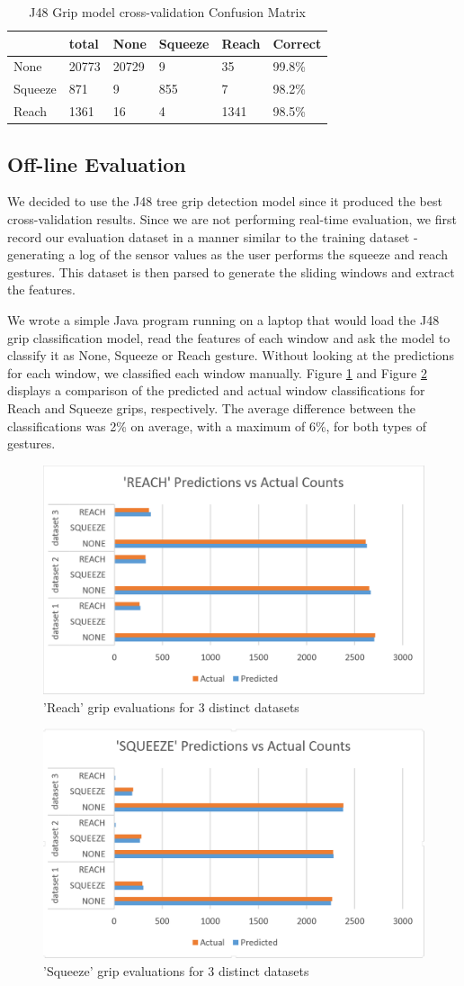 \begin{table}[!t]
\caption{J48 Grip model cross-validation Confusion Matrix}
\label{tbl-Grip Model J48}
\begin{tabular}{|l|l|l|l|l|l|}
\hline
        & total & None  & Squeeze & Reach & Correct \\ \hline \hline
None    & 20773 & 20729 & 9       & 35    & 99.8\%  \\ \hline
Squeeze & 871   & 9     & 855     & 7     & 98.2\%  \\ \hline
Reach   & 1361  & 16    & 4       & 1341  & 98.5\%  \\ \hline
\end{tabular}
\end{table}


\subsection{Off-line Evaluation}
We decided to use the J48 tree grip detection model since it produced the best cross-validation results. Since we are not performing real-time evaluation, we first record our evaluation dataset in a manner similar to the training dataset - generating a log of the sensor values as the user performs the squeeze and reach gestures. This dataset is then parsed to generate the sliding windows and extract the features. 
\par
We wrote a simple Java program running on a laptop that would load the J48 grip classification model, read the features of each window and ask the model to classify it as None, Squeeze or Reach gesture. Without looking at the predictions for each window, we classified each window manually. Figure \ref{fig:reach_eval} and Figure \ref{fig:squeeze_eval} displays a comparison of the predicted and actual window classifications for Reach and Squeeze grips, respectively. The average difference between the classifications was 2\% on average, with a maximum of 6\%, for both types of gestures.


\begin{figure}[h]
\includegraphics[width=.45\textwidth]{reach_eval.png}
\caption{'Reach' grip evaluations for 3 distinct datasets}
\label{fig:reach_eval}
\end{figure}


\begin{figure}[h]
\includegraphics[width=.45\textwidth]{squeeze_eval.png}
\caption{'Squeeze' grip evaluations for 3 distinct datasets}
\label{fig:squeeze_eval}
\end{figure}

